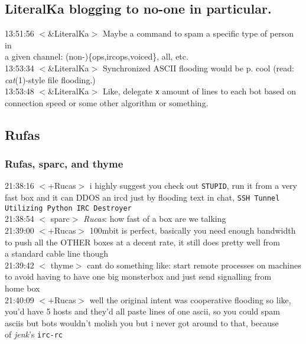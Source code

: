 \documentclass{article}
\begin{document}
\subsection{LiteralKa blogging to no-one in particular.}\label{LiteralKa blogging to no-one in particular.}
13:51:56 $<$\&LiteralKa$>$ Maybe a command to spam a specific type of person in\\\indent a given channel: (non-)\{ops,ircops,voiced\}, all, etc.\\
13:53:34 $<$\&LiteralKa$>$ Synchronized ASCII flooding would be p. cool (read:\\\indent \emph{cat}(1)-style file flooding.)\\
13:53:48 $<$\&LiteralKa$>$ Like, delegate {\tt x} amount of lines to each bot based on\\\indent connection speed or some other algorithm or something.
\subsection{Rufas}\label{Rufas}
\subsubsection{Rufas, sparc, and thyme}\label{Rufas, sparc, and thyme}
21:38:16 $<$+Rucas$>$ i highly suggest you check out {\tt STUPID}, run it from a very\\\indent fast box and it can DDOS an ircd just by flooding text in chat, {\tt SSH Tunnel\\\indent Utilizing Python IRC Destroyer}\\
21:38:54 $<$ sparc$>$ \emph{Rucas}: how fast of a box are we talking\\
21:39:00 $<$+Rucas$>$ 100mbit is perfect, basically you need enough bandwidth\\\indent to push all the OTHER boxes at a decent rate, it still does pretty well from\\\indent a standard cable line though\\
21:39:42 $<$ thyme$>$ cant do something like: start remote processes on machines\\\indent to avoid having to have one big monsterbox and just send signalling from\\\indent home box\\
21:40:09 $<$+Rucas$>$ well the original intent was cooperative flooding so like,\\\indent you'd have 5 hosts and they'd all paste lines of one ascii, so you could spam\\\indent asciis but bots wouldn't molish you but i never got around to that, because\\\indent of \emph{jenk}'s {\tt irc-rc}
\end{document}
